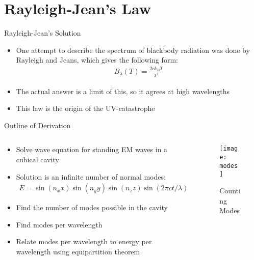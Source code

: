 \documentclass{beamer}
\begin{document}
\section{Rayleigh-Jean's Law}
\begin{frame}{Rayleigh-Jean's Solution}
  \begin{itemize}
  \item One attempt to describe the spectrum of blackbody radiation was done by Rayleigh and Jeans, which gives the following form:
    \begin{align*}
      B_\lambda(T)=\frac{2ck_BT}{\lambda^4}
    \end{align*}
  \item The actual answer is a limit of this, so it agrees at high wavelengths
  \item This law is the origin of the UV-catastrophe
  \end{itemize}
\end{frame}
\begin{frame}{Outline of Derivation}
  \begin{columns}
    \begin{column}{0.6\textwidth}
      \begin{itemize}
      \item Solve wave equation for standing EM waves in a cubical cavity
      \item Solution is an infinite number of normal modes:\small
        \begin{align*}
          E=\sin(n_xx)\sin(n_yy)\sin(n_zz)\sin(2\pi ct/\lambda)
        \end{align*}\normalsize
      \item Find the number of modes possible in the cavity
      \item Find modes per wavelength
      \item Relate modes per wavelength to energy per wavelength using equipartition theorem
      \end{itemize}
    \end{column}
    \begin{column}{0.4\textwidth}
      \begin{figure}[H]
        \centering
        \texttt{[image: modes]}
        \caption{Counting Modes}
      \end{figure}
    \end{column}
  \end{columns}
\end{frame}
\end{document}
